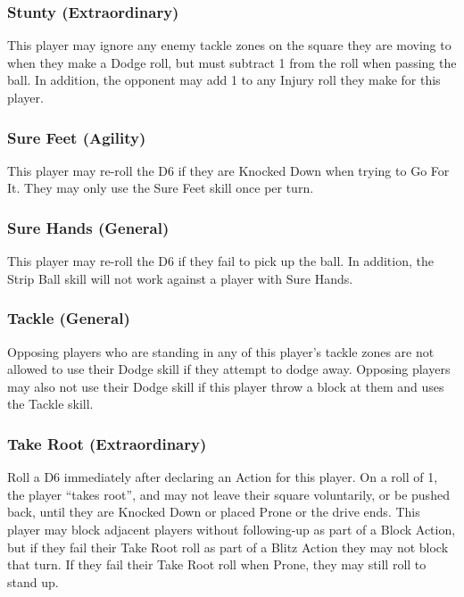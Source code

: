 \documentclass{article}
\begin{document}
\begin{multicols}{3}
\subsubsection{Stunty (Extraordinary)}
\par This player may ignore any enemy tackle zones on the square they are moving to when they make a Dodge roll, but must subtract 1 from the roll when passing the ball. In addition, the opponent may add 1 to any Injury roll they make for this player.

\subsubsection{Sure Feet (Agility)}
\par This player may re-roll the D6 if they are Knocked Down when trying to Go For It. They may only use the Sure Feet skill once per turn.

\subsubsection{Sure Hands (General)}
\par This player may re-roll the D6 if they fail to pick up the ball. In addition, the Strip Ball skill will not work against a player with Sure Hands.

\subsubsection{Tackle (General)}
\par Opposing players who are standing in any of this player's tackle zones are not allowed to use their Dodge skill if they attempt to dodge away. Opposing players may also not use their Dodge skill if this player throw a block at them and uses the Tackle skill.

\subsubsection{Take Root (Extraordinary)}
\par Roll a D6 immediately after declaring an Action for this player. On a roll of 1, the player “takes root”, and may not leave their square voluntarily, or be pushed back, until they are Knocked Down or placed Prone or the drive ends. This player may block adjacent players without following-up as part of a Block Action, but if they fail their Take Root roll as part of a Blitz Action they may not block that turn.  If they fail their Take Root roll when Prone, they may still roll to stand up.


\end{multicols}
\end{document}

